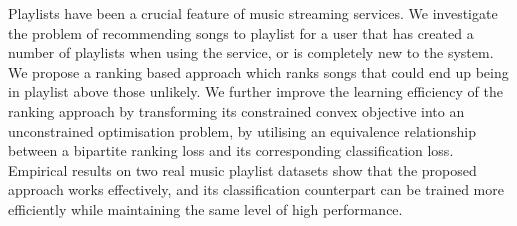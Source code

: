 Playlists have been a crucial feature of music streaming services.
We investigate the problem of recommending songs to playlist for
a user that has created a number of playlists when using the service,
or is completely new to the system.
We propose a ranking based approach which ranks songs that could end up being in playlist 
above those unlikely.
We further improve the learning efficiency of the ranking approach by transforming its
constrained convex objective into an unconstrained optimisation problem,
by utilising an equivalence relationship between a bipartite ranking loss 
and its corresponding classification loss.
Empirical results on two real music playlist datasets show that the proposed approach
works effectively, and its classification counterpart can be trained more efficiently
while maintaining the same level of high performance.
